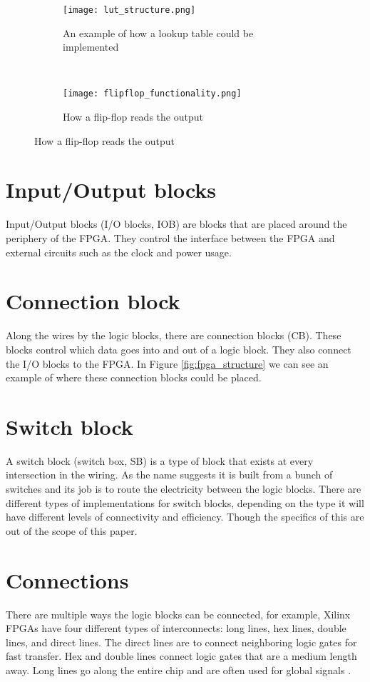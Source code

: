 \begin{figure}[H]
    \begin{subfigure}[b]{.4\textwidth}
        \centering
        \texttt{[image: lut\_structure.png]}
        \caption{An example of how a lookup table could be implemented}
        \label{fig:lut_flipflop}
    \end{subfigure}
    ~
    \centering
    \begin{subfigure}[b]{.4\textwidth}
        \centering
        \texttt{[image: flipflop\_functionality.png]}
        \caption{How a flip-flop reads the output}
        \label{fig:flipflop_func}
    \end{subfigure}
\end{figure}


\section{Input/Output blocks}
Input/Output blocks (I/O blocks, IOB) are blocks that are placed around the
periphery of the FPGA. They control the interface between the FPGA and external
circuits such as the clock and power usage.

\section{Connection block}
Along the wires by the logic blocks, there are connection blocks (CB). These blocks
control which data goes into and out of a logic block. They also connect the
I/O blocks to the FPGA. In Figure \ref{fig:fpga_structure} we can see an
example of where these connection blocks could be placed.

\section{Switch block}
A switch block (switch box, SB) is a type of block that exists at every
intersection in the wiring. As the name suggests it is built from a bunch of
switches and its job is to route the electricity between the logic blocks.
There are different types of implementations for switch blocks, depending on
the type it will have different levels of connectivity and efficiency. Though
the specifics of this are out of the scope of this paper.

\section{Connections}
There are multiple ways the logic blocks can be connected, for example, Xilinx
FPGAs have four different types of interconnects: long lines, hex lines, double
lines, and direct lines. The direct lines are to connect neighboring logic gates
for fast transfer. Hex and double lines connect logic gates that are a medium
length away. Long lines go along the entire chip and are often used for global
signals \citep{HideharuAmano8}.


